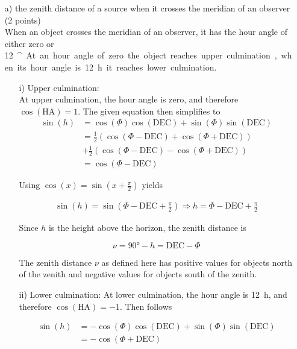 \documentclass[11pt,a4paper,twoside]{article}
\begin{document}
\begin{enumerate}
 \item[a)] the zenith distance of a source when it crosses the meridian of an observer (2 points) \\
 When an object crosses the meridian of an observer, it has the hour angle of either zero or \SI{12}{^\hour}. At an hour angle of zero the object reaches upper culmination, when its hour angle is \SI{12}{\hour} it reaches lower culmination. 
 \begin{enumerate}
  \item[i)] Upper culmination: \\
  At upper culmination, the hour angle is zero, and therefore $\cos{ \left( \text{HA} \right)} = 1$. The given equation then simplifies to 
  \begin{align}
   \sin{ \left( h \right)} &= \cos{ \left( \Phi \right)} \cos{ \left( \text{DEC} \right)} + \sin{ \left( \Phi \right)} \sin{ \left( \text{DEC} \right)} \\
   &= \frac{1}{2} \left( \cos{ \left( \Phi - \text{DEC} \right)} + \cos{ \left( \Phi + \text{DEC} \right)} \right) \\ &+ \frac{1}{2} \left( \cos{ \left( \Phi - \text{DEC} \right)} - \cos{ \left( \Phi + \text{DEC} \right)} \right) \\
   &= \cos{ \left( \Phi - \text{DEC} \right)}
  \end{align}
  
  Using $\cos{ \left( x \right)} = \sin{ \left( x + \frac{\pi}{2} \right)}$ yields 
  
  \begin{align}
   \sin{ \left( h \right)} = \sin{ \left( \Phi - \text{DEC} + \frac{\pi}{2} \right)}
   \Rightarrow h = \Phi - \text{DEC} + \frac{\pi}{2}
  \end{align}
  
  Since $h$ is the height above the horizon, the zenith distance is 
  
  \begin{equation}
   \nu = \ang{90} - h = \text{DEC} - \Phi
  \end{equation}
  
  The zenith distance $\nu$ as defined here has positive values for objects north of the zenith and negative values for objects south of the zenith. \\
  \item[ii)] Lower culmination: 
  At lower culmination, the hour angle is \SI{12}{\hour}, and therefore $\cos{ \left( \text{HA} \right)} = -1$. Then follows 
  
  \begin{align}
   \sin{ \left( h \right)} &= -\cos{ \left( \Phi \right)} \cos{ \left( \text{DEC} \right)} + \sin{ \left( \Phi \right)} \sin{ \left( \text{DEC} \right)} \\
   &= -\cos{ \left( \Phi + \text{DEC} \right)}
  \end{align}

 \end{enumerate}

\end{enumerate}
\end{document}
